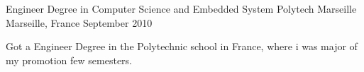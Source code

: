 

\begin{cventries}

  \cventry
    {Engineer Degree in Computer Science and Embedded System} %
    {Polytech Marseille} %
    {Marseille, France} %
    {September 2010} %
    {
      \begin{cvitems} %
        \item {Got a Engineer Degree in the Polytechnic school in France, where i was major of my promotion few semesters.}
      \end{cvitems}
    }

\end{cventries}
